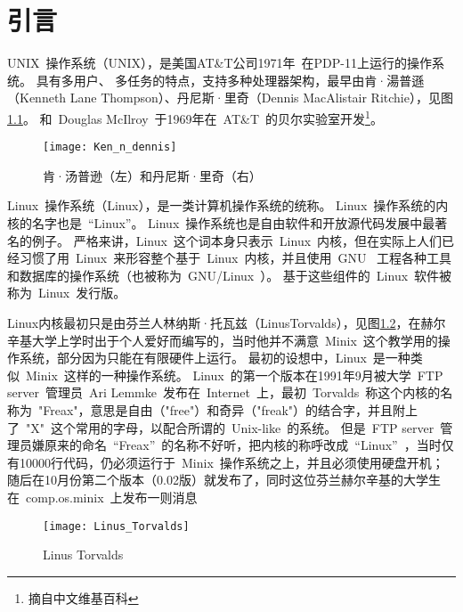 \documentclass[../Main/thesis.tex]{subfiles}
\begin{document}
\chapter{引言}
\label{cha:intro}
UNIX~操作系统（UNIX），是美国AT\&T公司1971年~在PDP-11上运行的操作系统。
具有多用户、 多任务的特点，支持多种处理器架构，最早由肯·湯普遜（Kenneth Lane Thompson）、丹尼斯·里奇（Dennis MacAlistair Ritchie），见图\ref{fig:ken}。
和~Douglas McIlroy~于1969年在~AT\&T~的贝尔实验室开发\footnote{摘自中文维基百科}。

\begin{figure}[htbp]
  \centering
  \texttt{[image: Ken\_n\_dennis]}
  \caption{肯·汤普逊（左）和丹尼斯·里奇（右）}
  \label{fig:ken}
\end{figure}
Linux~操作系统（Linux），是一类计算机操作系统的统称。
Linux~操作系统的内核的名字也是~“Linux”。
Linux~操作系统也是自由软件和开放源代码发展中最著名的例子。
严格来讲，Linux~这个词本身只表示~Linux~内核，但在实际上人们已经习惯了用~Linux~来形容整个基于~Linux~内核，并且使用~GNU~ 工程各种工具和数据库的操作系统（也被称为~GNU/Linux~）。
基于这些组件的~Linux~软件被称为~Linux~发行版。

Linux内核最初只是由芬兰人林纳斯·托瓦兹（LinusTorvalds），见图\ref{fig:linus}，在赫尔辛基大学上学时出于个人爱好而编写的，当时他并不满意~Minix~这个教学用的操作系统，部分因为只能在有限硬件上运行。
最初的设想中，Linux~是一种类似~Minix~这样的一种操作系统。
Linux~的第一个版本在1991年9月被大学~FTP server~管理员~Ari Lemmke~发布在~Internet~上，最初~Torvalds~称这个内核的名称为~"Freax"，意思是自由（"free"）和奇异（"freak"）的结合字，并且附上了~"X"~这个常用的字母，以配合所谓的~Unix-like~的系统。
但是~FTP server~管理员嫌原来的命名~“Freax”~的名称不好听，把内核的称呼改成~“Linux”~，当时仅有10000行代码，仍必须运行于~Minix~操作系统之上，并且必须使用硬盘开机；
随后在10月份第二个版本（0.02版）就发布了，同时这位芬兰赫尔辛基的大学生在~comp.os.minix~上发布一则消息

\begin{center}
\end{center}
\begin{figure}[htbp]
  \centering
  \texttt{[image: Linus\_Torvalds]}
  \caption{Linus Torvalds}
  \label{fig:linus}
\end{figure}
\end{document}
